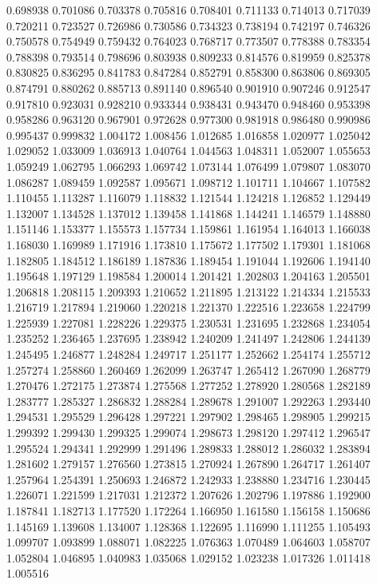 0.698938
0.701086
0.703378
0.705816
0.708401
0.711133
0.714013
0.717039
0.720211
0.723527
0.726986
0.730586
0.734323
0.738194
0.742197
0.746326
0.750578
0.754949
0.759432
0.764023
0.768717
0.773507
0.778388
0.783354
0.788398
0.793514
0.798696
0.803938
0.809233
0.814576
0.819959
0.825378
0.830825
0.836295
0.841783
0.847284
0.852791
0.858300
0.863806
0.869305
0.874791
0.880262
0.885713
0.891140
0.896540
0.901910
0.907246
0.912547
0.917810
0.923031
0.928210
0.933344
0.938431
0.943470
0.948460
0.953398
0.958286
0.963120
0.967901
0.972628
0.977300
0.981918
0.986480
0.990986
0.995437
0.999832
1.004172
1.008456
1.012685
1.016858
1.020977
1.025042
1.029052
1.033009
1.036913
1.040764
1.044563
1.048311
1.052007
1.055653
1.059249
1.062795
1.066293
1.069742
1.073144
1.076499
1.079807
1.083070
1.086287
1.089459
1.092587
1.095671
1.098712
1.101711
1.104667
1.107582
1.110455
1.113287
1.116079
1.118832
1.121544
1.124218
1.126852
1.129449
1.132007
1.134528
1.137012
1.139458
1.141868
1.144241
1.146579
1.148880
1.151146
1.153377
1.155573
1.157734
1.159861
1.161954
1.164013
1.166038
1.168030
1.169989
1.171916
1.173810
1.175672
1.177502
1.179301
1.181068
1.182805
1.184512
1.186189
1.187836
1.189454
1.191044
1.192606
1.194140
1.195648
1.197129
1.198584
1.200014
1.201421
1.202803
1.204163
1.205501
1.206818
1.208115
1.209393
1.210652
1.211895
1.213122
1.214334
1.215533
1.216719
1.217894
1.219060
1.220218
1.221370
1.222516
1.223658
1.224799
1.225939
1.227081
1.228226
1.229375
1.230531
1.231695
1.232868
1.234054
1.235252
1.236465
1.237695
1.238942
1.240209
1.241497
1.242806
1.244139
1.245495
1.246877
1.248284
1.249717
1.251177
1.252662
1.254174
1.255712
1.257274
1.258860
1.260469
1.262099
1.263747
1.265412
1.267090
1.268779
1.270476
1.272175
1.273874
1.275568
1.277252
1.278920
1.280568
1.282189
1.283777
1.285327
1.286832
1.288284
1.289678
1.291007
1.292263
1.293440
1.294531
1.295529
1.296428
1.297221
1.297902
1.298465
1.298905
1.299215
1.299392
1.299430
1.299325
1.299074
1.298673
1.298120
1.297412
1.296547
1.295524
1.294341
1.292999
1.291496
1.289833
1.288012
1.286032
1.283894
1.281602
1.279157
1.276560
1.273815
1.270924
1.267890
1.264717
1.261407
1.257964
1.254391
1.250693
1.246872
1.242933
1.238880
1.234716
1.230445
1.226071
1.221599
1.217031
1.212372
1.207626
1.202796
1.197886
1.192900
1.187841
1.182713
1.177520
1.172264
1.166950
1.161580
1.156158
1.150686
1.145169
1.139608
1.134007
1.128368
1.122695
1.116990
1.111255
1.105493
1.099707
1.093899
1.088071
1.082225
1.076363
1.070489
1.064603
1.058707
1.052804
1.046895
1.040983
1.035068
1.029152
1.023238
1.017326
1.011418
1.005516
